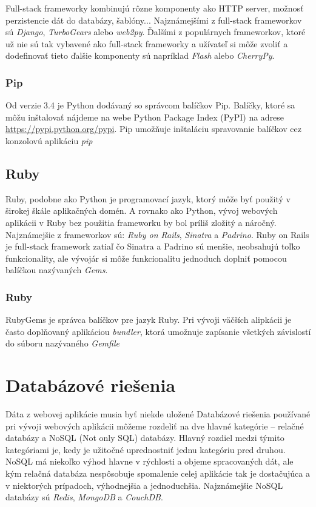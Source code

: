 Full-stack frameworky kombinujú rôzne komponenty ako HTTP server, možnosť perzistencie dát do databázy, šablóny... Najznámejšími z full-stack frameworkov sú \emph{Django}, \emph{TurboGears} alebo \emph{web2py}. Ďalšími z populárnych frameworkov, ktoré už nie sú tak vybavené ako full-stack frameworky a užívateľ si môže zvoliť a dodefinovať tieto ďalšie komponenty sú napríklad \emph{Flash} alebo \emph{CherryPy}.

\subsubsection*{Pip}

Od verzie 3.4 je Python dodávaný so správcom balíčkov Pip. Balíčky, ktoré sa môžu inštalovať nájdeme na webe Python Package Index (PyPI) na adrese \url{https://pypi.python.org/pypi}. Pip umožňuje inštaláciu spravovanie balíčkov cez konzolovú aplikáciu \emph{pip}

\subsection*{Ruby}

Ruby, podobne ako Python je programovací jazyk, ktorý môže byť použitý v širokej škále aplikačných domén. A rovnako ako Python, vývoj webových aplikácii v Ruby bez použitia frameworku by bol príliš zložitý a náročný. Najznámejšie z frameworkov sú: \emph{Ruby on Rails}, \emph{Sinatra} a \emph{Padrino}. Ruby on Rails je full-stack framework zatiaľ čo Sinatra a Padrino sú menšie, neobsahujú toľko funkcionality, ale vývojár si môže funkcionalitu jednoduch doplniť pomocou balíčkou nazývaných \emph{Gems}.

\subsubsection*{Ruby}

RubyGems je správca balíčkov pre jazyk Ruby. Pri vývoji väčších alipkácii je často doplňovaný aplikáciou \emph{bundler}, ktorá umožnuje zapísanie všetkých závislostí do súboru nazývaného \emph{Gemfile}


\section{Databázové riešenia}

Dáta z webovej aplikácie musia byť niekde uložené Databázové riešenia používané pri vývoji webových aplikácii môžeme rozdeliť na dve hlavné kategórie -- relačné databázy a NoSQL (Not only SQL) databázy. Hlavný rozdiel medzi týmito kategóriami je, kedy je užitočné uprednostniť jednu kategóriu pred druhou. NoSQL má niekoľko výhod hlavne v rýchlosti a objeme spracovaných dát, ale kým relačná databáza nespôsobuje spomalenie celej aplikácie tak je dostačujúca a v niektorých prípadoch, výhodnejšia a jednoduchšia. Najznámejšie NoSQL databázy sú \emph{Redis}, \emph{MongoDB} a \emph{CouchDB}.

